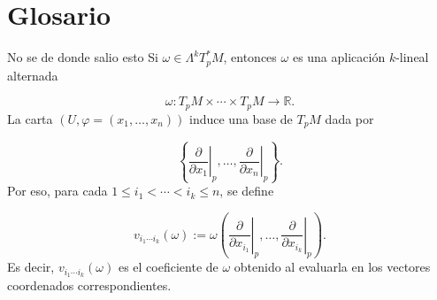 \section{Glosario}
\begin{bookremark}{No se de donde salio esto}
Si $\omega\in\Lambda^kT_p^*M$, entonces $\omega$ es una aplicación $k$-lineal alternada

\[
\omega:T_pM\times\cdots\times T_pM\to\mathbb R.
\]
La carta $(U,\varphi=(x_1,\ldots,x_n))$ induce una base de $T_pM$ dada por

\[
\left\{\left.\frac{\partial}{\partial x_1}\right|_p,\ldots,\left.\frac{\partial}{\partial x_n}\right|_p\right\}.
\]
Por eso, para cada $1\le i_1<\cdots<i_k\le n$, se define

\[
v_{i_1\cdots i_k}(\omega):=\omega\left(\left.\frac{\partial}{\partial x_{i_1}}\right|_p,\ldots,\left.\frac{\partial}{\partial x_{i_k}}\right|_p\right).
\]
Es decir, $v_{i_1\cdots i_k}(\omega)$ es el coeficiente de $\omega$ obtenido al evaluarla en los vectores coordenados correspondientes.

\end{bookremark}
\label{blk:4e8085}
